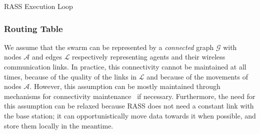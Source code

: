 \begin{algorithm}[htbp]
\small
\SetAlgoLined
\DontPrintSemicolon
 \caption{\ac{RASS} Execution Loop}
 \label{alg:rass}
\end{algorithm}



\subsubsection{Routing Table}
\label{section:routingTable}
We assume that the swarm can be represented by a
\textit{connected} graph
$\mathcal{G}$ with nodes $\mathcal{A}$ and edges $\mathcal{L}$
respectively representing agents and their wireless communication
links. In practice, this connectivity cannot be maintained at all times, because of the quality of the links in $\mathcal{L}$ and because of the movements of nodes $\mathcal{A}$. However, this assumption can be mostly maintained through mechanisms for connectivity maintenance~\cite{varadharajan2020swarm} if necessary. Furthermore, the need for this assumption can be relaxed because \ac{RASS} does not need a constant link with the base station; it can opportunistically move data towards it when possible, and store them locally in the meantime.

